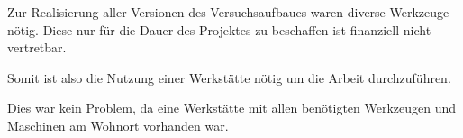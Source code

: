 Zur Realisierung aller Versionen des Versuchsaufbaues waren diverse Werkzeuge nötig.
Diese nur für die Dauer des Projektes zu beschaffen ist finanziell nicht vertretbar.

Somit ist also die Nutzung einer Werkstätte nötig um die Arbeit durchzuführen.

Dies war kein Problem, da eine Werkstätte mit allen benötigten Werkzeugen und Maschinen am Wohnort vorhanden war.